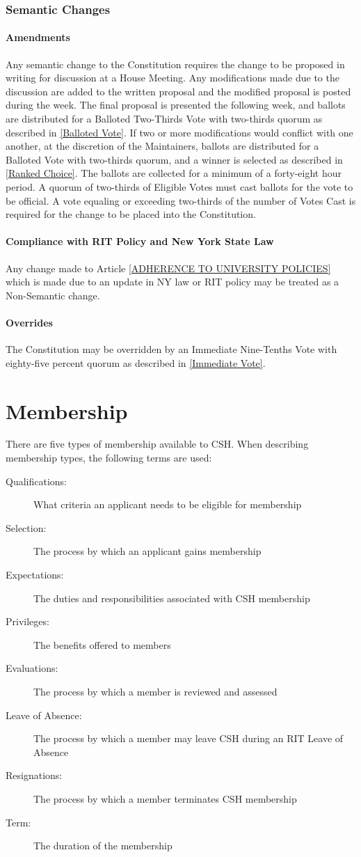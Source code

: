 \documentclass{article}
\newcommand{\article}[1]{\section{#1} \label{#1}}
\newcommand{\asubsection}[1]{\subsubsection{#1} \label{#1}}
\newcommand{\asubsubsection}[1]{\paragraph{#1} \label{#1}}
\begin{document}
\asubsection{Semantic Changes}
\asubsubsection{Amendments}
Any semantic change to the Constitution requires the change to be proposed in writing for discussion at a House Meeting.
Any modifications made due to the discussion are added to the written proposal and the modified proposal is posted during the week.
The final proposal is presented the following week, and ballots are distributed for a Balloted Two-Thirds Vote with two-thirds quorum as described in \ref{Balloted Vote}.
If two or more modifications would conflict with one another, at the discretion of the Maintainers, ballots are distributed for a Balloted Vote with two-thirds quorum, and a winner is selected as described in \ref{Ranked Choice}.
The ballots are collected for a minimum of a forty-eight hour period.
A quorum of two-thirds of Eligible Votes must cast ballots for the vote to be official.
A vote equaling or exceeding two-thirds of the number of Votes Cast is required for the change to be placed into the Constitution.
\asubsubsection{Compliance with RIT Policy and New York State Law}
Any change made to Article  \ref{ADHERENCE TO UNIVERSITY POLICIES} which is made due to an update in NY law or RIT policy may be treated as a Non-Semantic change.
 
\asubsubsection{Overrides}
The Constitution may be overridden by an Immediate Nine-Tenths Vote with eighty-five percent quorum as described in \ref{Immediate Vote}.

\article{Membership}
There are five types of membership available to CSH.
When describing membership types, the following terms are used:
\begin{description}
	\item[Qualifications:] What criteria an applicant needs to be eligible for membership
	\item[Selection:] The process by which an applicant gains membership
	\item[Expectations:] The duties and responsibilities associated with CSH membership
	\item[Privileges:] The benefits offered to members
	\item[Evaluations:] The process by which a member is reviewed and assessed
	\item[Leave of Absence:] The process by which a member may leave CSH during an RIT Leave of Absence
	\item[Resignations:] The process by which a member terminates CSH membership
	\item[Term:] The duration of the membership
\end{description}
\end{document}
